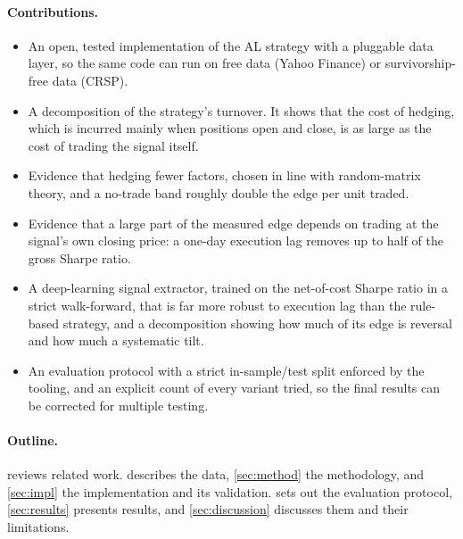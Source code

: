 \paragraph{Contributions.}
\begin{itemize}
  \item An open, tested implementation of the AL strategy with a pluggable data layer, so the
        same code can run on free data (Yahoo Finance) or survivorship-free data (CRSP).
  \item A decomposition of the strategy's turnover. It shows that the cost of hedging, which is
        incurred mainly when positions open and close, is as large as the cost of trading the
        signal itself.
  \item Evidence that hedging fewer factors, chosen in line with random-matrix theory, and a
        no-trade band roughly double the edge per unit traded.
  \item Evidence that a large part of the measured edge depends on trading at the signal's own
        closing price: a one-day execution lag removes up to half of the gross Sharpe ratio.
  \item A deep-learning signal extractor, trained on the net-of-cost Sharpe ratio in a strict
        walk-forward, that is far more robust to execution lag than the rule-based strategy, and a
        decomposition showing how much of its edge is reversal and how much a systematic tilt.
  \item An evaluation protocol with a strict in-sample/test split enforced by the tooling, and an
        explicit count of every variant tried, so the final results can be corrected for
        multiple testing.
\end{itemize}

\paragraph{Outline.}
 reviews related work.  describes the data,
\cref{sec:method} the methodology, and \cref{sec:impl} the implementation and its validation.
 sets out the evaluation protocol, \cref{sec:results} presents results, and
\cref{sec:discussion} discusses them and their limitations.
